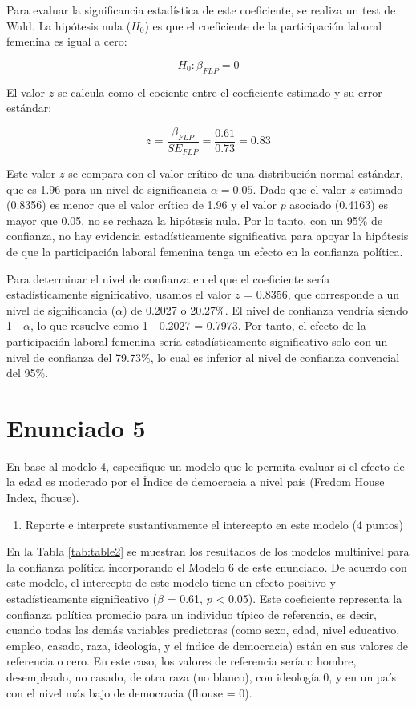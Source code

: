 \documentclass[
  12pt,
  a4paper,
]{article}
\providecommand{\tightlist}{%
  \setlength{\itemsep}{0pt}\setlength{\parskip}{0pt}}
\begin{document}
Para evaluar la significancia estadística de este coeficiente, se realiza un test de Wald. La hipótesis nula (\(H_0\)) es que el coeficiente de la participación laboral femenina es igual a cero:

\[
H_0: \beta_{FLP} = 0
\]

El valor \(z\) se calcula como el cociente entre el coeficiente estimado y su error estándar:

\[
z = \frac{\beta_{FLP}}{SE_{FLP}} = \frac{0.61}{0.73} = 0.83
\]

Este valor \(z\) se compara con el valor crítico de una distribución normal estándar, que es 1.96 para un nivel de significancia \(\alpha = 0.05\). Dado que el valor \(z\) estimado (0.8356) es menor que el valor crítico de 1.96 y el valor \(p\) asociado (0.4163) es mayor que 0.05, no se rechaza la hipótesis nula. Por lo tanto, con un 95\% de confianza, no hay evidencia estadísticamente significativa para apoyar la hipótesis de que la participación laboral femenina tenga un efecto en la confianza política.

Para determinar el nivel de confianza en el que el coeficiente sería estadísticamente significativo, usamos el valor \(z\) = 0.8356, que corresponde a un nivel de significancia (\(\alpha\)) de 0.2027 o 20.27\%. El nivel de confianza vendría siendo 1 - \(\alpha\), lo que resuelve como 1 - 0.2027 = 0.7973. Por tanto, el efecto de la participación laboral femenina sería estadísticamente significativo solo con un nivel de confianza del 79.73\%, lo cual es inferior al nivel de confianza convencial del 95\%.

\hypertarget{enunciado-5}{%
\section{Enunciado 5}\label{enunciado-5}}

En base al modelo 4, especifique un modelo que le permita evaluar si el efecto de la edad es moderado por el Índice de democracia a nivel país (Fredom House Index, fhouse).

\begin{enumerate}
\def\labelenumi{\alph{enumi})}
\tightlist
\item
  Reporte e interprete sustantivamente el intercepto en este modelo (4 puntos)
\end{enumerate}

En la Tabla \ref{tab:table2} se muestran los resultados de los modelos multinivel para la confianza política incorporando el Modelo 6 de este enunciado. De acuerdo con este modelo, el intercepto de este modelo tiene un efecto positivo y estadísticamente significativo (\(\beta\) = 0.61, \(p\) \textless{} 0.05). Este coeficiente representa la confianza política promedio para un individuo típico de referencia, es decir, cuando todas las demás variables predictoras (como sexo, edad, nivel educativo, empleo, casado, raza, ideología, y el índice de democracia) están en sus valores de referencia o cero. En este caso, los valores de referencia serían: hombre, desempleado, no casado, de otra raza (no blanco), con ideología 0, y en un país con el nivel más bajo de democracia (fhouse = 0).
\end{document}
